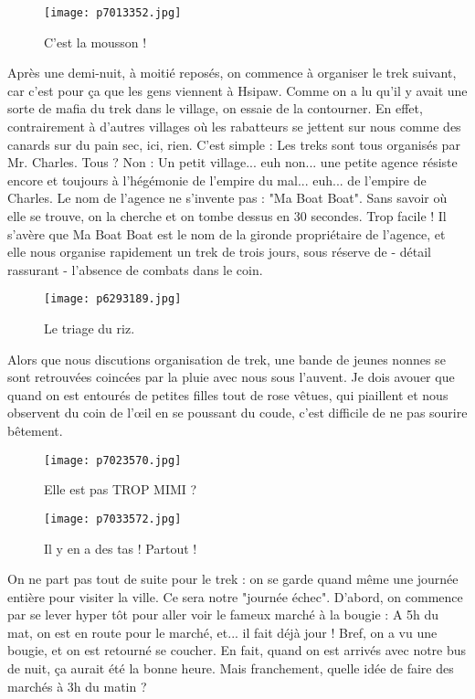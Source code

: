 \documentclass{book}
\begin{document}
\begin{figure}[h]
\centering
\texttt{[image: p7013352.jpg]}
\caption*{C'est la mousson !}
\end{figure}

Après une demi-nuit, à moitié reposés, on commence à organiser le trek suivant, car c'est pour ça que les gens viennent à Hsipaw. Comme on a lu qu'il y avait une sorte de mafia du trek dans le village, on essaie de la contourner. En effet, contrairement à d'autres villages où les rabatteurs se jettent sur nous comme des canards sur du pain sec, ici, rien. C'est simple : Les treks sont tous organisés par Mr. Charles. Tous ? Non : Un petit village... euh non... une petite agence résiste encore et toujours à l'hégémonie de l'empire du mal... euh... de l'empire de Charles. Le nom de l'agence ne s'invente pas : "Ma Boat Boat". Sans savoir où elle se trouve, on la cherche et on tombe dessus en 30 secondes. Trop facile ! Il s'avère que Ma Boat Boat est le nom de la gironde propriétaire de l'agence, et elle nous organise rapidement un trek de trois jours, sous réserve de - détail rassurant - l'absence de combats dans le coin.


\begin{figure}[h]
\centering
\texttt{[image: p6293189.jpg]}
\caption*{Le triage du riz.}
\end{figure}

Alors que nous discutions organisation de trek, une bande de jeunes nonnes se sont retrouvées coincées par la pluie avec nous sous l'auvent. Je dois avouer que quand on est entourés de petites filles tout de rose vêtues, qui piaillent et nous observent du coin de l’œil en se poussant du coude, c'est difficile de ne pas sourire bêtement.


\begin{figure}[h]
\centering
\texttt{[image: p7023570.jpg]}
\caption*{Elle est pas TROP MIMI ?}
\end{figure}


\begin{figure}[h]
\centering
\texttt{[image: p7033572.jpg]}
\caption*{Il y en a des tas ! Partout !}
\end{figure}

On ne part pas tout de suite pour le trek : on se garde quand même une journée entière pour visiter la ville. Ce sera notre "journée échec". D'abord, on commence par se lever hyper tôt pour aller voir le fameux marché à la bougie : A 5h du mat, on est en route pour le marché, et... il fait déjà jour ! Bref, on a vu une bougie, et on est retourné se coucher. En fait, quand on est arrivés avec notre bus de nuit, ça aurait été la bonne heure. Mais franchement, quelle idée de faire des marchés à 3h du matin ?
\end{document}
